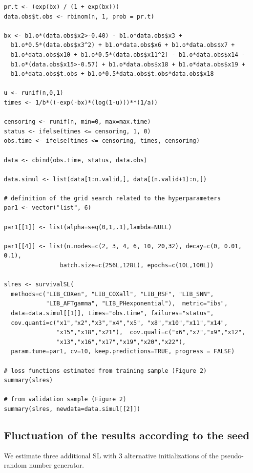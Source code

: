 \begin{verbatim}
pr.t <- (exp(bx) / (1 + exp(bx)))
data.obs$t.obs <- rbinom(n, 1, prob = pr.t)

bx <- b1.o*(data.obs$x2>-0.40) - b1.o*data.obs$x3 +
  b1.o*0.5*(data.obs$x3^2) + b1.o*data.obs$x6 + b1.o*data.obs$x7 +
  b1.o*data.obs$x10 + b1.o*0.5*(data.obs$x11^2) - b1.o*data.obs$x14 -
  b1.o*(data.obs$x15>-0.57) + b1.o*data.obs$x18 + b1.o*data.obs$x19 +
  b1.o*data.obs$t.obs + b1.o*0.5*data.obs$t.obs*data.obs$x18

u <- runif(n,0,1)
times <- 1/b*((-exp(-bx)*(log(1-u)))**(1/a))

censoring <- runif(n, min=0, max=max.time)
status <- ifelse(times <= censoring, 1, 0)
obs.time <- ifelse(times <= censoring, times, censoring)
  
data <- cbind(obs.time, status, data.obs)

data.simul <- list(data[1:n.valid,], data[(n.valid+1):n,])

# definition of the grid search related to the hyperparameters
par1 <- vector("list", 6)

par1[[1]] <- list(alpha=seq(0,1,.1),lambda=NULL)

par1[[4]] <- list(n.nodes=c(2, 3, 4, 6, 10, 20,32), decay=c(0, 0.01, 0.1),
                batch.size=c(256L,128L), epochs=c(10L,100L))

slres <- survivalSL(
  methods=c("LIB_COXen", "LIB_COXall", "LIB_RSF", "LIB_SNN",
            "LIB_AFTgamma", "LIB_PHexponential"),  metric="ibs",
  data=data.simul[[1]], times="obs.time", failures="status",
  cov.quanti=c("x1","x2","x3","x4","x5", "x8","x10","x11","x14",
               "x15","x18","x21"),  cov.quali=c("x6","x7","x9","x12",
               "x13","x16","x17","x19","x20","x22"),
  param.tune=par1, cv=10, keep.predictions=TRUE, progress = FALSE)

# loss functions estimated from training sample (Figure 2)
summary(slres) 

# from validation sample (Figure 2)
summary(slres, newdata=data.simul[[2]]) 
\end{verbatim}

\hypertarget{fluctuation-of-the-results-according-to-the-seed}{%
\subsection{Fluctuation of the results according to the seed}\label{fluctuation-of-the-results-according-to-the-seed}}

We estimate three additional SL with 3 alternative initializations of the pseudo-random number generator.

